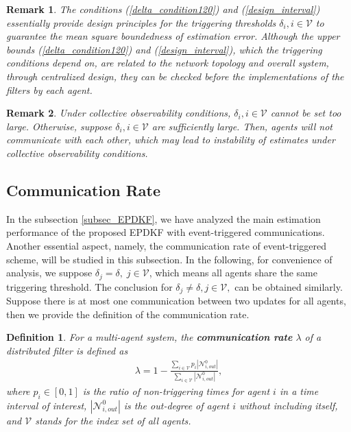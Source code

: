 \documentclass[journal,transmag]{IEEEtran}
\newtheorem{definition}{\textbf{Definition}}
\newtheorem{remark}{\textbf{Remark}}
\begin{document}
{	
	{
	\begin{remark}
			The conditions (\ref{delta_condition120}) and (\ref{design_interval}) essentially provide design principles for  the triggering thresholds $\delta_{i},i\in\mathcal{V}$ to guarantee the mean square boundedness of estimation error.  Although the upper bounds (\ref{delta_condition120}) and (\ref{design_interval}), which the triggering conditions depend on, are related to the network topology and overall system, through centralized design, they can be checked  before the implementations of the filters by each agent.
	\end{remark}
}
	\begin{remark}	
		Under collective observability conditions, $\delta_{i},i\in\mathcal{V}$ cannot be set too large.  Otherwise, suppose $\delta_{i},i\in\mathcal{V}$ are sufficiently large. Then, agents will not communicate with each other, which may lead to instability of estimates under collective observability conditions.
	\end{remark}

	

\subsection{Communication Rate}
In the subsection \ref{subsec_EPDKF}, we have analyzed the main estimation performance of the proposed EPDKF with event-triggered communications.
Another essential aspect, namely, the communication rate of event-triggered scheme, will be studied in this subsection. 
In the following, for convenience of analysis, we suppose $\delta_{j}=\delta,\; j\in \mathcal{V}$, which means all agents share the same triggering threshold. The conclusion for $\delta_{j}\neq\delta,j\in \mathcal{V},$ can be obtained similarly. Suppose there is at most one communication between two updates for all agents, then we provide the definition of the communication rate.


\begin{definition}
	For a multi-agent system, 	 the \textbf{communication rate} $\lambda$ of a distributed filter is defined as
\begin{align}\label{eq_rate}
\lambda=1-\frac{\sum_{i\in\mathcal{V}}p_i|\mathcal{N}_{i,out}^0| }{\sum_{i\in\mathcal{V}}|\mathcal{N}_{i,out}^0|},
\end{align}
where $p_i\in[0,1]$ is the ratio of non-triggering times for agent $i$ in a time interval of interest, $|\mathcal{N}_{i,out}^0|$ is the out-degree of agent $i$ without including itself, 	 and $\mathcal{V}$ stands for the index set of all agents.
\end{definition}




}
\end{document}
